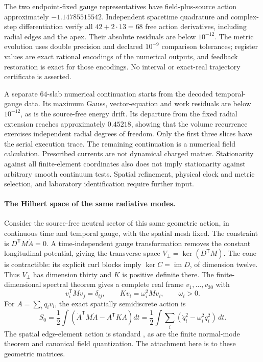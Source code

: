 The two endpoint-fixed gauge representatives have field-plus-source action
approximately \(-1.14785515542\). Independent spacetime quadrature and
complex-step differentiation verify all \(42+2\cdot13=68\) free action
derivatives, including radial edges and the apex. Their absolute residuals
are below \(10^{-12}\). The metric evolution uses double precision and
declared \(10^{-9}\) comparison tolerances; register values are exact
rational encodings of the numerical outputs, and feedback restoration is
exact for those encodings. No interval or exact-real trajectory certificate
is asserted.

A separate \(64\)-slab numerical continuation starts from the decoded
temporal-gauge data. Its maximum Gauss, vector-equation and work residuals
are below \(10^{-12}\), as is the source-free energy drift. Its departure
from the fixed radial extension reaches approximately \(0.45218\),
showing that the volume recurrence exercises independent radial degrees
of freedom. Only the first three slices have the serial execution trace.
The remaining continuation is a numerical field calculation.
Prescribed currents are not dynamical charged matter. Stationarity against
all finite-element coordinates also does not imply stationarity against
arbitrary smooth continuum tests. Spatial refinement, physical clock and
metric selection, and laboratory identification require further input.

\paragraph{The Hilbert space of the same radiative modes.}
Consider the source-free neutral sector of this same geometric action,
in continuous time and temporal gauge, with the spatial mesh fixed. The constraint is
\(D^{\mathsf T}M\dot A=0\). A time-independent gauge transformation
removes the constant longitudinal potential, giving the transverse space
\(V_\perp=\ker(D^{\mathsf T}M)\). The cone is contractible:
its explicit curl blocks imply \(\ker C=\operatorname{im}D\),
of dimension twelve. Thus \(V_\perp\) has dimension thirty and
\(K\) is positive definite there. The finite-dimensional spectral theorem
gives a complete real frame \(v_1,\ldots,v_{30}\) with
\[
 v_i^{\mathsf T}Mv_j=\delta_{ij},\qquad
 Kv_i=\omega_i^2Mv_i,\qquad \omega_i>0.
\]
For \(A=\sum_i q_i v_i\), the exact spatially semidiscrete action is
\[
 S_0=\frac12\int\left(\dot A^{\mathsf T}M\dot A-A^{\mathsf T}KA\right)dt
    =\frac12\int\sum_i(\dot q_i^2-\omega_i^2q_i^2)\,dt.
\]
The spatial edge-element action is standard \cite{HeTeixeira2005}, as are
the finite normal-mode theorem and canonical field quantization. The
attachment here is to these geometric matrices.

